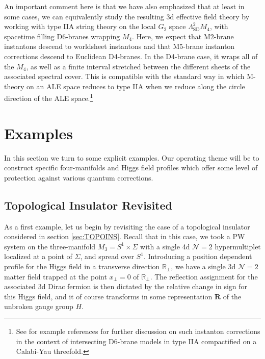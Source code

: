 \documentclass[12pt]{article}%
\numberwithin{equation}{section}
\renewcommand{\(}{\left(}
\renewcommand{\)}{\right)}
\renewcommand{\[}{\left[}
\renewcommand{\]}{\right]}
\begin{document}
An important comment here is that we have also emphasized that at least in some cases, we can equivalently study the resulting 3d effective field theory by working with type IIA string theory on the local $G_2$ space $\Lambda_{\mathrm{SD}}^{2} M_4$, with spacetime filling D6-branes wrapping $M_4$. Here, we expect that M2-brane instantons descend to worldsheet instantons and that M5-brane instanton corrections descend to Euclidean D4-branes. In the D4-brane case, it wraps all of the $M_4$, as well as a finite interval stretched between the different sheets of the associated spectral cover. This is compatible with the standard way in which M-theory on an ALE space reduces to type IIA when we reduce along the circle direction of the ALE space.\footnote{See for example references \cite{Blumenhagen:2006xt, Blumenhagen:2009qh} for further discussion on
such instanton corrections in the context of intersecting D6-brane models in type IIA compactified on a Calabi-Yau threefold.}

\section{Examples} \label{sec:EXAMPLES}

In this section we turn to some explicit examples. Our operating theme will
be to construct specific four-manifolds and Higgs field profiles
which offer some level of protection against various quantum corrections.

\subsection{Topological Insulator Revisited} \label{ssec:TOPOAGAIN}

As a first example, let us begin by revisiting the case of a topological insulator considered in section \ref{sec:TOPOINS}. Recall that in this case, we took a PW system on the three-manifold $M_3 = S^1 \times \Sigma$ with a single 4d $\mathcal{N} = 2$ hypermultiplet localized at a point of $\Sigma$, and spread over $S^1$. Introducing a position dependent profile for the Higgs field in a transverse direction $\mathbb{R}_{\bot}$, we have a single 3d $\mathcal{N} = 2$ matter field trapped at the point $x_\bot = 0$ of $\mathbb{R}_{\bot}$. The reflection assignment for the associated 3d Dirac fermion is then dictated by the relative change in sign for this Higgs field, and it of course transforms in some representation $\mathbf{R}$ of the unbroken gauge group $H$.
\end{document}
